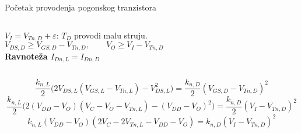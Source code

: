 \begin{frame}[label=09_1-s039]{Početak provođenja pogonskog tranzistora}\setlength{\parskip}{2pt}\setlength{\abovedisplayskip}{4pt}\setlength{\belowdisplayskip}{4pt}\setlength{\abovedisplayshortskip}{3pt}\setlength{\belowdisplayshortskip}{3pt}
\begin{columns}[T,onlytextwidth]\centering {}$V_I=V_{Tn,D}+\varepsilon$: $T_D$ provodi malu struju.\[V_{DS,D}\geq V_{GS,D}-V_{Tn,D},\qquad V_O\geq V_I-V_{Tn,D}\]
\textbf{Ravnoteža $I_{Dn,L}=I_{Dn,D}$}\end{columns}\[\frac{k_{n,L}}2\bigl(2V_{DS,L}(V_{GS,L}-V_{Tn,L})-V_{DS,L}^2\bigr)=\frac{k_{n,D}}2(V_{GS,D}-V_{Tn,D})^2\]
\[\frac{k_{n,L}}2\bigl(2(V_{DD}-V_O)(V_C-V_O-V_{Tn,L})-(V_{DD}-V_O)^2\bigr)=\frac{k_{n,D}}2(V_I-V_{Tn,D})^2\]
\[k_{n,L}(V_{DD}-V_O)(2V_C-2V_{Tn,L}-V_{DD}-V_O)=k_{n,D}(V_I-V_{Tn,D})^2\]

\end{frame}
